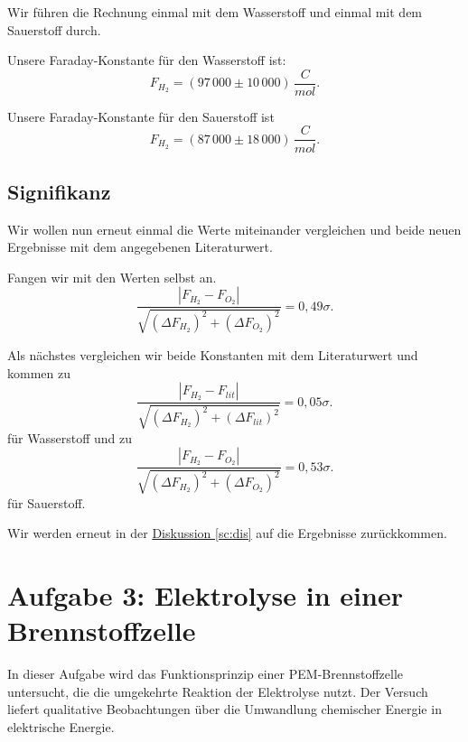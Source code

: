 Wir führen die Rechnung einmal mit dem Wasserstoff und einmal mit dem Sauerstoff durch.

Unsere Faraday-Konstante für den Wasserstoff ist:
\begin{equation}
    \boxed{
        F_{H_2} = (97\,000 \pm 10\,000) \, \frac{C}{mol}.
    }
\end{equation}

Unsere Faraday-Konstante für den Sauerstoff ist
\begin{equation}
    \boxed{
        F_{H_2} = (87\,000 \pm 18\,000) \, \frac{C}{mol}.
    }
\end{equation}

\subsection*{Signifikanz}
Wir wollen nun erneut einmal die Werte miteinander vergleichen und beide neuen Ergebnisse mit dem angegebenen Literaturwert.

Fangen wir mit den Werten selbst an.
\begin{equation}
    \frac{\left| F_{H_2} - F_{O_2} \right|}{\sqrt{(\Delta F_{H_2})^2 + (\Delta F_{O_2})^2}} = 0,49\sigma.
\end{equation}

Als nächstes vergleichen wir beide Konstanten mit dem Literaturwert und kommen zu
\begin{equation}
    \frac{\left| F_{H_2} - F_{lit} \right|}{\sqrt{(\Delta F_{H_2})^2 + (\Delta F_{lit})^2}} = 0,05\sigma.
\end{equation}
für Wasserstoff
und zu
\begin{equation}
    \frac{\left| F_{H_2} - F_{O_2} \right|}{\sqrt{(\Delta F_{H_2})^2 + (\Delta F_{O_2})^2}} = 0,53\sigma.
\end{equation}
für Sauerstoff.

Wir werden erneut in der \hyperref[sc:dis]{Diskussion \ref*{sc:dis}} auf die Ergebnisse zurückkommen.

\section{Aufgabe 3: Elektrolyse in einer Brennstoffzelle}

In dieser Aufgabe wird das Funktionsprinzip einer PEM-Brennstoffzelle untersucht, die die umgekehrte Reaktion der Elektrolyse nutzt. Der Versuch liefert qualitative Beobachtungen über die Umwandlung chemischer Energie in elektrische Energie.

